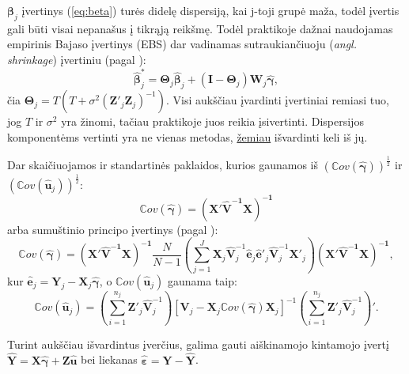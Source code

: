 \documentclass[12pt,a4paper]{article}
\begin{document}
$\boldsymbol{\beta}_j$ įvertinys (\ref{eq:beta}) turės didelę dispersiją, kai j-toji grupė maža, todėl įvertis gali būti visai nepanašus į tikrąją reikšmę. Todėl praktikoje dažnai naudojamas empirinis Bajaso įvertinys (EBS) dar vadinamas sutraukiančiuoju (\textit{angl. shrinkage}) įvertiniu (pagal \cite{shrinkage}):
\begin{equation}
\boldsymbol{\hat{\beta}}^*_{j}=\boldsymbol{\Theta}_j\boldsymbol{\hat{\beta}}_j+(\boldsymbol{I} - \boldsymbol{\Theta}_j)\mathbf{W}_j\boldsymbol{\hat{\gamma}},
\end{equation}
čia $\mathbf{\Theta}_j=T\left(T+\sigma^2(\mathbf{Z}'_j\mathbf{Z}_j)^{-1}\right)$. Visi aukščiau įvardinti įvertiniai remiasi tuo, jog $T$ ir $\sigma^2$ yra žinomi, tačiau praktikoje juos reikia įsivertinti. Dispersijos komponentėms vertinti yra ne vienas metodas, \hyperlink{reml}{žemiau} išvardinti keli iš jų.

\indent Dar skaičiuojamos ir standartinės paklaidos, kurios gaunamos iš $(\mathbb{C}ov(\boldsymbol{\hat{\gamma}}))^{\frac{1}{2}}$ ir $(\mathbb{C}ov(\mathbf{\hat{u}}_j))^{\frac{1}{2}}$:
\begin{equation}
\mathbb{C}ov(\boldsymbol{\hat{\gamma}})=\mathbf{(X'\hat{V}^{-1}X)^{-1}}
\end{equation}
arba sumuštinio principo įvertinys (pagal \cite{sandwich}):
\begin{equation}
\mathbb{C}ov(\boldsymbol{\hat{\gamma}})=\mathbf{(X'\hat{V}^{-1}X)^{-1}}\frac{N}{N-1}\left(\sum^J_{j=1}\mathbf{X}_j\mathbf{\hat{V}}^{-1}_j\mathbf{\hat{e}}_j\mathbf{\hat{e}}'_j \mathbf{\hat{V}}^{-1}_j\mathbf{X}'_j\right)\mathbf{(X'\hat{V}^{-1}X)^{-1}},
\end{equation}
kur $\mathbf{\hat{e}}_j=\mathbf{Y}_j-\mathbf{X}_j\boldsymbol{\hat{\gamma}}$, o $\mathbb{C}ov(\mathbf{\hat{u}}_j)$ gaunama taip:
\begin{equation}
\mathbb{C}ov(\mathbf{\hat{u}}_j)=\left(\sum^{n_j}_{i=1}\mathbf{Z}'_j\mathbf{\hat{V}}^{-1}_j\right) \left[\mathbf{V}_j-\mathbf{X}_j\mathbb{C}ov(\boldsymbol{\hat{\gamma}})\mathbf{X}_j\right]^{-1} \left(\sum^{n_j}_{i=1}\mathbf{Z}'_j\mathbf{\hat{V}}^{-1}_j\right)'.
\end{equation}

\indent Turint aukščiau išvardintus įverčius, galima gauti aiškinamojo kintamojo įvertį $\mathbf{\hat{Y}}=\mathbf{X}\boldsymbol{\hat{\gamma}}+\mathbf{Z\hat{u}}$ bei liekanas $\boldsymbol{\hat{\varepsilon}}=\mathbf{Y}-\mathbf{\hat{Y}}$.
\end{document}
